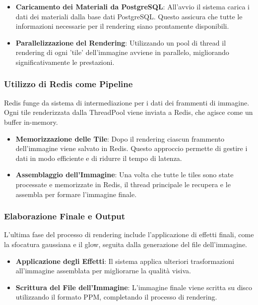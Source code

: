 \documentclass[12pt]{article}
\begin{document}
\begin{itemize}
\item \textbf{Caricamento dei Materiali da PostgreSQL}: All'avvio il sistema carica i dati dei materiali dalla base dati PostgreSQL. Questo assicura che tutte le informazioni necessarie per il rendering siano prontamente disponibili.
\item \textbf{Parallelizzazione del Rendering}: Utilizzando un pool di thread il rendering di ogni 'tile' dell'immagine avviene in parallelo, migliorando significativamente le prestazioni.
\end{itemize}

\subsubsection{Utilizzo di Redis come Pipeline}
Redis funge da sistema di intermediazione per i dati dei frammenti di immagine. Ogni tile renderizzata dalla ThreadPool viene inviata a Redis, che agisce come un buffer in-memory.

\begin{itemize}
\item \textbf{Memorizzazione delle Tile}: Dopo il rendering ciascun frammento dell'immagine viene salvato in Redis. Questo approccio permette di gestire i dati in modo efficiente e di ridurre il tempo di latenza.
\item \textbf{Assemblaggio dell'Immagine}: Una volta che tutte le tiles sono state processate e memorizzate in Redis, il thread principale le recupera e le assembla per formare l'immagine finale.
\end{itemize}

\subsubsection{Elaborazione Finale e Output}
L'ultima fase del processo di rendering include l'applicazione di effetti finali, come la sfocatura gaussiana e il glow, seguita dalla generazione del file dell'immagine.

\begin{itemize}
\item \textbf{Applicazione degli Effetti}: Il sistema applica ulteriori trasformazioni all'immagine assemblata per migliorarne la qualità visiva.

\item \textbf{Scrittura del File dell'Immagine}: L'immagine finale viene scritta su disco utilizzando il formato PPM, completando il processo di rendering.
\end{itemize}
\end{document}
